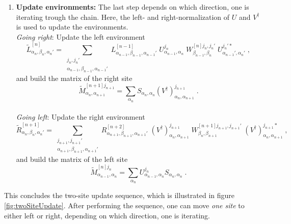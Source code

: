 \begin{enumerate}
\item
\textbf{Update environments:} The last step depends on which direction, one is iterating trough the chain. Here, the left- and right-normalization of $U$ and $V^{\dag}$ is used to update the environments.\\
\textit{Going right}: Update the left environment
\begin{equation}
	\tilde{L}_{\alpha_{n}, \beta_{n} , \alpha_{n} '}^{[n]} = \sum_{\substack{ j_{n} , j_{n} ' \\ \alpha_{n-1} , \beta_{n-1} , \alpha_{n-1} '}} L_{\alpha_{n-1}, \beta_{n-1} , \alpha_{n-1} '}^{[n-1]} \; U_{\alpha_{n-1} , \alpha_{n}}^{j_n} \; W_{\beta_{n-1} , \beta_{n}}^{[n] j_n , j_n '} \; U_{\alpha_{n-1} ', \alpha_{n}'}^{j_n ' *} \; ,
\label{eq:updateLeft}
\end{equation}
and build the matrix of the right site
\begin{equation}
	\tilde{M}_{\alpha_{n} , \alpha_{n+1}}^{[n+1] j_{n+1} } = \sum_{\alpha_n}  S_{\alpha_n , \alpha_n} (V^{\dag})_{\alpha_{n} , \alpha_{n+1}}^{j_{n+1}} \; .
\end{equation}\\ 
\textit{Going left}: Update the right environment
\begin{equation}
	\tilde{R}_{\alpha_{n}, \beta_{n} , \alpha_{n} '}^{[n+1]} = \sum_{\substack{ j_{n+1} , j_{n+1} ' \\ \alpha_{n+1} , \beta_{n+1} , \alpha_{n+1} '}} R_{\alpha_{n+1}, \beta_{n+1} , \alpha_{n+1} '}^{[n+2]} \; \left( V^{\dag} \right)_{\alpha_{n} , \alpha_{n+1}}^{j_{n+1}} \; W_{\beta_{n} , \beta_{n+1}}^{[n+1] j_{n+1} , j_{n+1} '} \; \left( V^{\dag} \right)_{\alpha_{n} , \alpha_{n+1}}^{j_{n+1} *} \; ,
	\label{eq:updateRight}
\end{equation}
and build the matrix of the left site
\begin{equation}
	\tilde{M}_{\alpha_{n-1} , \alpha_{n}}^{[n] j_{n} } = \sum_{\alpha_n} U_{\alpha_{n-1} , \alpha_{n}}^{j_n} S_{\alpha_n , \alpha_n}  \; .
\end{equation} 
 
\end{enumerate}
This concludes the two-site update sequence, which is illustrated in figure \ref{fig:twoSiteUpdate}. After performing the sequence, one can move \textit{one site} to either left or right, depending on which direction, one is iterating.

